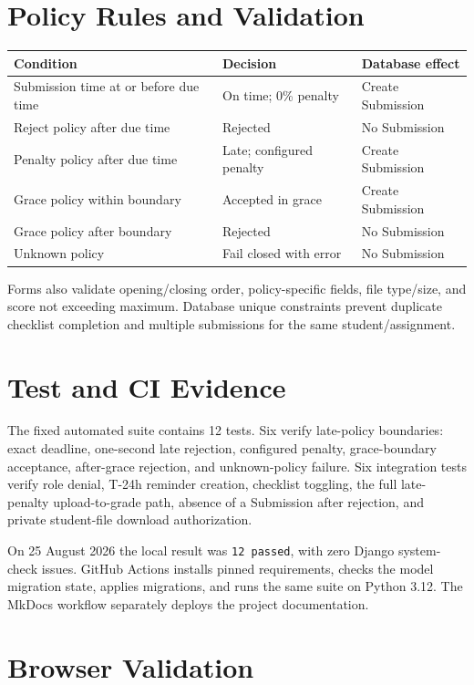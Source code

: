 \documentclass[11pt,a4paper]{article}
\begin{document}
\section{Policy Rules and Validation}

\begin{tabularx}{\textwidth}{@{}X X X@{}}
\toprule
\textbf{Condition} & \textbf{Decision} & \textbf{Database effect} \\
\midrule
Submission time at or before due time & On time; 0\% penalty & Create Submission \\
Reject policy after due time & Rejected & No Submission \\
Penalty policy after due time & Late; configured penalty & Create Submission \\
Grace policy within boundary & Accepted in grace & Create Submission \\
Grace policy after boundary & Rejected & No Submission \\
Unknown policy & Fail closed with error & No Submission \\
\bottomrule
\end{tabularx}

Forms also validate opening/closing order, policy-specific fields, file type/size, and score not exceeding maximum. Database unique constraints prevent duplicate checklist completion and multiple submissions for the same student/assignment.

\section{Test and CI Evidence}

The fixed automated suite contains 12 tests. Six verify late-policy boundaries: exact deadline, one-second late rejection, configured penalty, grace-boundary acceptance, after-grace rejection, and unknown-policy failure. Six integration tests verify role denial, T-24h reminder creation, checklist toggling, the full late-penalty upload-to-grade path, absence of a Submission after rejection, and private student-file download authorization.

On 25 August 2026 the local result was \texttt{12 passed}, with zero Django system-check issues. GitHub Actions installs pinned requirements, checks the model migration state, applies migrations, and runs the same suite on Python 3.12. The MkDocs workflow separately deploys the project documentation.

\section{Browser Validation}
\end{document}
